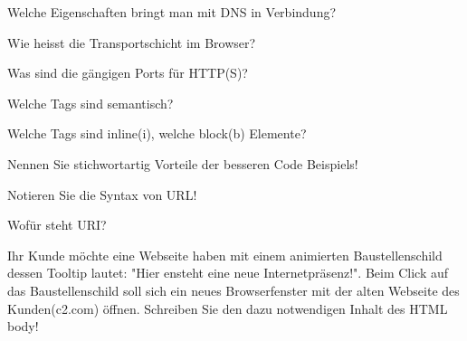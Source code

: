 \documentclass[10pt,ngerman]{examdesign}
\begin{document}
\begin{multiplechoice}

  \begin{question}
    Welche Eigenschaften bringt man mit DNS in Verbindung?
    \smallskip
  \end{question}


  \begin{question}
    Wie heisst die Transportschicht im Browser?
    \smallskip
  \end{question}


  \begin{question}
    Was sind die gängigen Ports für HTTP(S)?
    \smallskip
  \end{question}


  \begin{question}
    Welche Tags sind semantisch?
    \smallskip
  \end{question}


  \begin{question}
    Welche Tags sind inline(i), welche block(b) Elemente?
    \smallskip
  \end{question}


  \begin{question}
    Nennen Sie stichwortartig Vorteile der besseren Code Beispiels!
    \bigskip
  \end{question}

  \begin{question}
    Notieren Sie die Syntax von URL!
    \bigskip
  \end{question}

  \begin{question}
    Wof\"ur steht URI?
    \smallskip
  \end{question}

  \begin{question}
    Ihr Kunde m\"ochte eine Webseite haben mit einem animierten
    Baustellenschild dessen Tooltip lautet: "Hier ensteht eine neue
    Internetpr\"asenz!". Beim Click auf das Baustellenschild soll sich ein
    neues Browserfenster mit der alten Webseite des Kunden(c2.com) \"offnen.
    Schreiben Sie den dazu notwendigen Inhalt des HTML \<body\>!
    \bigskip
  \end{question}


\end{multiplechoice}
\end{document}
